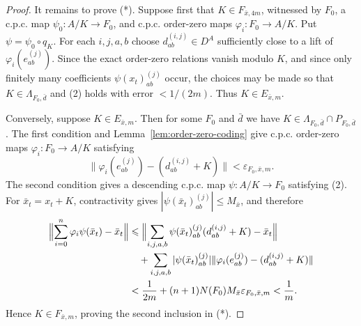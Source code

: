 \documentclass[10pt,a4paper]{amsart}
\renewcommand{\le}{\leqslant}
\begin{document}
\begin{proof}
It remains to prove (*).  Suppose first that $K\in F_{\bar x,4m}$, witnessed by
$F_0$, a c.p.c. map $\psi_0:A/K\to F_0$, and c.p.c. order-zero maps
$\varphi_i:F_0\to A/K$.  Put $\psi=\psi_0\circ q_K$.  For each $i,j,a,b$ choose
$d_{ab}^{(i,j)}\in D^A$ sufficiently close to a lift of
$\varphi_i(e_{ab}^{(j)})$.  Since the exact order-zero relations vanish modulo $K$,
and since only finitely many coefficients $\psi(x_t)^{(j)}_{ab}$ occur, the choices may
be made so that $K\in\Lambda_{F_0,\bar d}$ and (2) holds with error $<1/(2m)$.
Thus $K\in E_{\bar x,m}$.

Conversely, suppose $K\in E_{\bar x,m}$.  Then for some $F_0$ and $\bar d$ we have
$K\in\Lambda_{F_0,\bar d}\cap P_{F_0,\bar d}$.  The first condition and
Lemma~\ref{lem:order-zero-coding} give c.p.c. order-zero maps
$\varphi_i:F_0\to A/K$ satisfying
\[
\|\varphi_i(e_{ab}^{(j)})-(d_{ab}^{(i,j)}+K)\|
<\varepsilon_{F_0,\bar x,m}.
\]
The second condition gives a descending c.p.c. map $\psi:A/K\to F_0$ satisfying (2).
For $\bar x_t=x_t+K$, contractivity gives
$|\psi(\bar x_t)^{(j)}_{ab}|\le M_{\bar x}$, and therefore
\[
\begin{aligned}
\Bigl\|\sum_{i=0}^{n}\varphi_i\psi(\bar x_t)-\bar x_t\Bigr\|
&\le
\Bigl\|
\sum_{i,j,a,b}\psi(\bar x_t)^{(j)}_{ab}(d_{ab}^{(i,j)}+K)-\bar x_t
\Bigr\| \\
&\quad+
\sum_{i,j,a,b}|\psi(\bar x_t)^{(j)}_{ab}|
\|\varphi_i(e_{ab}^{(j)})-(d_{ab}^{(i,j)}+K)\| \\
&<\frac1{2m}+(n+1)N(F_0)M_{\bar x}\varepsilon_{F_0,\bar x,m}
<\frac1m.
\end{aligned}
\]
Hence $K\in F_{\bar x,m}$, proving the second inclusion in (*).
\end{proof}
\end{document}

